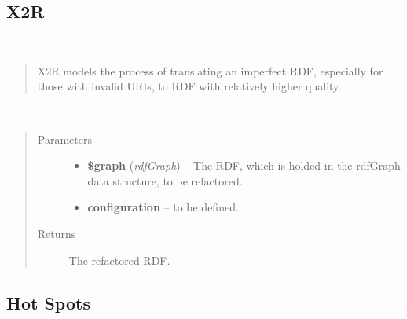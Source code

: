 \documentclass[letterpaper,10pt,english]{sphinxmanual}
\begin{document}
\subsection{X2R}
\label{docs/api:x2r}

\begin{fulllineitems}
\label{docs/api:X2R}~\begin{quote}

X2R models the process of translating an imperfect RDF, especially for those with invalid URIs, to RDF with relatively higher quality.
\end{quote}

\begin{fulllineitems}
\label{docs/api:X2R::transform}~\begin{quote}\begin{description}
\item[{Parameters}] \leavevmode\begin{itemize}
\item {} 
\textbf{\$graph} (\emph{rdfGraph}) -- The RDF, which is holded in the rdfGraph data structure, to be refactored.

\item {} 
\textbf{configuration} -- to be defined.

\end{itemize}

\item[{Returns}] \leavevmode
The refactored RDF.

\end{description}\end{quote}

\end{fulllineitems}


\end{fulllineitems}



\subsection{Hot Spots}
\label{docs/api:hot-spots}
\end{document}
